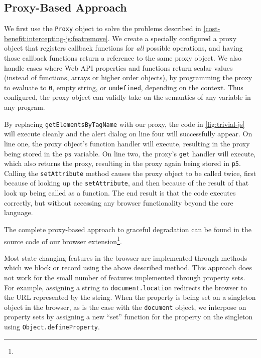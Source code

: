 \subsection{Proxy-Based Approach}
\label{cost-benefit:intercepting-js:proxy-general}

We first use the \texttt{Proxy} object to solve the problems described in
\ref{cost-benefit:intercepting-js:featremove}.  We create a specially configured a proxy object
that registers callback functions for \textit{all} possible \JS
operations, and having those callback functions return a reference to the
same proxy object.  We also handle cases where Web API properties and
functions return scalar values (instead of functions, arrays or higher order
objects), by programming the proxy to evaluate to \texttt{0}, empty string,
or \texttt{undefined}, depending on the context. Thus configured, the proxy
object can validly take on the semantics of any variable in any \JS program.

By replacing \texttt{getElementsByTagName} with our proxy, the code in
\ref{fig:trivial-js} will execute cleanly and the alert dialog on line
four will successfully appear.  On line one, the proxy object's function handler
will execute, resulting in the proxy being stored in the \texttt{ps} variable.
On line two, the proxy's \texttt{get} handler will execute, which also returns
the proxy, resulting in the proxy again being stored in \texttt{p5}.
Calling the \texttt{setAttribute} method causes the proxy object
to be called twice, first because of looking up the \texttt{setAttribute},
and then because of the result of that look up being called as a function.  The
end result is that the code executes correctly, but without
accessing any browser functionality beyond the core \JS language.

The complete proxy-based approach to graceful degradation can be found in
the source code of our browser extension\footnote{\ExtensionSourceUrl}.

Most state changing features in the browser are implemented through methods
which we block or record using the above described method.  This approach
does not work for the small number of features implemented through property sets.
For example, assigning a string to \texttt{document.location} redirects
the browser to the URL represented by the string.  When the property is
being set on a singleton object in the browser, as is the case with the
\texttt{document} object, we interpose on property sets by assigning a new
``set'' function for the property on the singleton using
\texttt{Object.defineProperty}.

